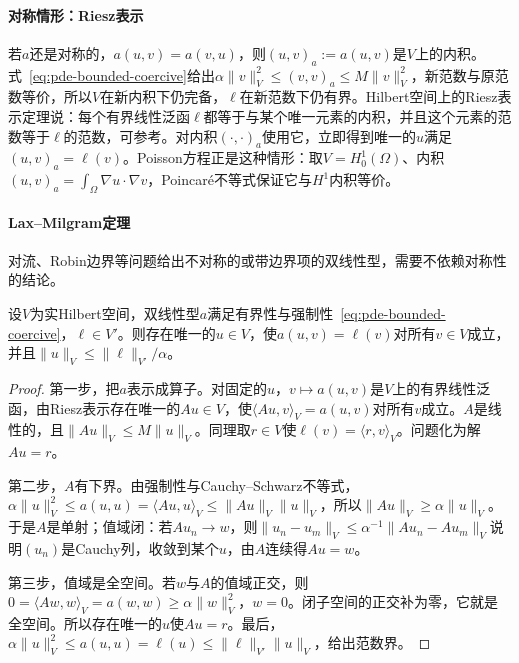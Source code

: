 \paragraph{对称情形：Riesz表示}
若$a$还是对称的，$a(u,v)=a(v,u)$，则$(u,v)_a:=a(u,v)$是$V$上的内积。式~\eqref{eq:pde-bounded-coercive}给出$\alpha\|v\|_V^2\leq(v,v)_a\leq M\|v\|_V^2$，新范数与原范数等价，所以$V$在新内积下仍完备，$\ell$在新范数下仍有界。Hilbert空间上的Riesz表示定理说：每个有界线性泛函$\ell$都等于与某个唯一元素的内积，并且这个元素的范数等于$\ell$的范数，可参考。对内积$(\cdot,\cdot)_a$使用它，立即得到唯一的$u$满足$(u,v)_a=\ell(v)$。Poisson方程正是这种情形：取$V=H_0^1(\Omega)$、内积$(u,v)_a=\int_\Omega\nabla u\cdot\nabla v$，Poincaré不等式保证它与$H^1$内积等价。

\paragraph{Lax--Milgram定理}
对流、Robin边界等问题给出不对称的或带边界项的双线性型，需要不依赖对称性的结论。

\begin{theorem}
\label{thm:pde-lax-milgram}
设$V$为实Hilbert空间，双线性型$a$满足有界性与强制性~\eqref{eq:pde-bounded-coercive}，$\ell\in V'$。则存在唯一的$u\in V$，使$a(u,v)=\ell(v)$对所有$v\in V$成立，并且$\|u\|_V\leq\|\ell\|_{V'}/\alpha$。
\end{theorem}

\begin{proof}
第一步，把$a$表示成算子。对固定的$u$，$v\mapsto a(u,v)$是$V$上的有界线性泛函，由Riesz表示存在唯一的$Au\in V$，使$\langle Au,v\rangle_V=a(u,v)$对所有$v$成立。$A$是线性的，且$\|Au\|_V\leq M\|u\|_V$。同理取$r\in V$使$\ell(v)=\langle r,v\rangle_V$。问题化为解$Au=r$。

第二步，$A$有下界。由强制性与Cauchy--Schwarz不等式，$\alpha\|u\|_V^2\leq a(u,u)=\langle Au,u\rangle_V\leq\|Au\|_V\|u\|_V$，所以$\|Au\|_V\geq\alpha\|u\|_V$。于是$A$是单射；值域闭：若$Au_n\to w$，则$\|u_n-u_m\|_V\leq\alpha^{-1}\|Au_n-Au_m\|_V$说明$(u_n)$是Cauchy列，收敛到某个$u$，由$A$连续得$Au=w$。

第三步，值域是全空间。若$w$与$A$的值域正交，则$0=\langle Aw,w\rangle_V=a(w,w)\geq\alpha\|w\|_V^2$，$w=0$。闭子空间的正交补为零，它就是全空间。所以存在唯一的$u$使$Au=r$。最后，$\alpha\|u\|_V^2\leq a(u,u)=\ell(u)\leq\|\ell\|_{V'}\|u\|_V$，给出范数界。
\end{proof}


